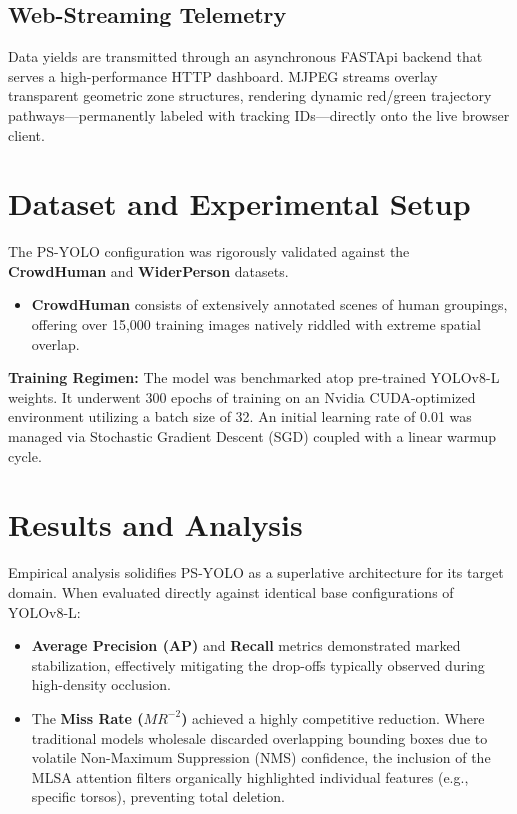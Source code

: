 \documentclass[11pt,a4paper]{article}
\begin{document}
\subsection{Web-Streaming Telemetry}
Data yields are transmitted through an asynchronous FASTApi backend that serves a high-performance HTTP dashboard. MJPEG streams overlay transparent geometric zone structures, rendering dynamic red/green trajectory pathways---permanently labeled with tracking IDs---directly onto the live browser client. 

\section{Dataset and Experimental Setup}
The PS-YOLO configuration was rigorously validated against the \textbf{CrowdHuman} and \textbf{WiderPerson} datasets.
\begin{itemize}
    \item \textbf{CrowdHuman} consists of extensively annotated scenes of human groupings, offering over 15,000 training images natively riddled with extreme spatial overlap.
\end{itemize}

\noindent \textbf{Training Regimen:} The model was benchmarked atop pre-trained YOLOv8-L weights. It underwent 300 epochs of training on an Nvidia CUDA-optimized environment utilizing a batch size of 32. An initial learning rate of 0.01 was managed via Stochastic Gradient Descent (SGD) coupled with a linear warmup cycle.

\section{Results and Analysis}
Empirical analysis solidifies PS-YOLO as a superlative architecture for its target domain. When evaluated directly against identical base configurations of YOLOv8-L:
\begin{itemize}
    \item \textbf{Average Precision (AP)} and \textbf{Recall} metrics demonstrated marked stabilization, effectively mitigating the drop-offs typically observed during high-density occlusion.
    \item The \textbf{Miss Rate ($MR^{-2}$)} achieved a highly competitive reduction. Where traditional models wholesale discarded overlapping bounding boxes due to volatile Non-Maximum Suppression (NMS) confidence, the inclusion of the MLSA attention filters organically highlighted individual features (e.g., specific torsos), preventing total deletion.
\end{itemize}
\end{document}
